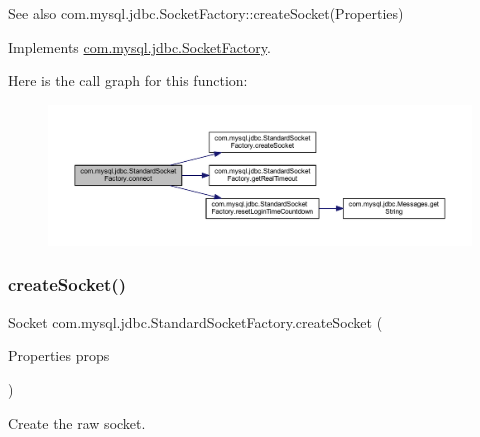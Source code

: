 \begin{DoxySeeAlso}{See also}
com.\+mysql.\+jdbc.\+Socket\+Factory\+::create\+Socket(\+Properties) 
\end{DoxySeeAlso}


Implements \mbox{\hyperlink{interfacecom_1_1mysql_1_1jdbc_1_1_socket_factory_a2e5061cef1109ab4689437fe177c4ffe}{com.\+mysql.\+jdbc.\+Socket\+Factory}}.

Here is the call graph for this function\+:
\nopagebreak
\begin{figure}[H]
\begin{center}
\leavevmode
\includegraphics[width=350pt]{classcom_1_1mysql_1_1jdbc_1_1_standard_socket_factory_a3b3577f8cc0de73aa70e6f672e066c6f_cgraph}
\end{center}
\end{figure}
\mbox{\label{classcom_1_1mysql_1_1jdbc_1_1_standard_socket_factory_ac59fccd4861f3da102251a22ec119aeb}} 
\subsubsection{\texorpdfstring{create\+Socket()}{createSocket()}}
{\footnotesize\ttfamily Socket com.\+mysql.\+jdbc.\+Standard\+Socket\+Factory.\+create\+Socket (\begin{DoxyParamCaption}\item[{Properties}]{props }\end{DoxyParamCaption})\hspace{0.3cm}{\ttfamily [protected]}}

Create the raw socket.



